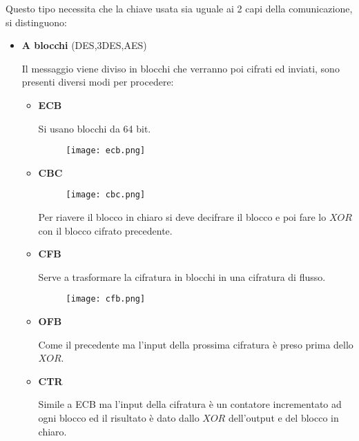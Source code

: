 \documentclass{article}
\begin{document}
Questo tipo necessita che la chiave usata sia uguale ai 2 capi della comunicazione, si distinguono:
\begin{itemize}
    \item \textbf{A blocchi} (DES,3DES,AES)

        Il messaggio viene diviso in blocchi che verranno poi cifrati ed inviati, sono presenti diversi modi per procedere:
        \begin{itemize}
            \item \textbf{ECB}

                Si usano blocchi da 64 bit.

                \begin{figure}[ht]
                    \centering
                    \texttt{[image: ecb.png]}
                \end{figure}

            \item \textbf{CBC}

                \begin{figure}[ht]
                    \centering
                    \texttt{[image: cbc.png]}
                \end{figure}

                Per riavere il blocco in chiaro si deve decifrare il blocco e poi fare lo $XOR$ con il blocco cifrato precedente.

            \newpage

            \item \textbf{CFB}

                Serve a trasformare la cifratura in blocchi in una cifratura di flusso.

                \begin{figure}[ht]
                    \centering
                    \texttt{[image: cfb.png]}
                \end{figure}                

            \item \textbf{OFB}

                Come il precedente ma l'input della prossima cifratura è preso prima dello $XOR$.\newline

            \item \textbf{CTR}

                Simile a ECB ma l'input della cifratura è un contatore incrementato ad ogni blocco ed il risultato è dato dallo $XOR$ dell'output e del blocco in chiaro.


\end{itemize}
\end{itemize}
\end{document}
